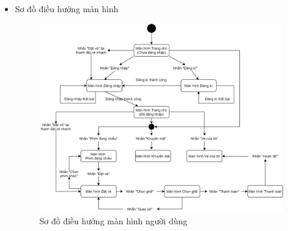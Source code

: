 \documentclass[a4paper, 12pt]{article}
\begin{document}
\begin{itemize}
	\item Sơ đồ điều hướng màn hình
		\begin{figure}[H]
			\begin{center}
				\includegraphics[scale = 0.3]{Diagram/User Screen-flow diagram.png}
				\caption{Sơ đồ điều hướng màn hình người dùng}
			\end{center}
		\end{figure}

	\clearpage


\end{itemize}
\end{document}
